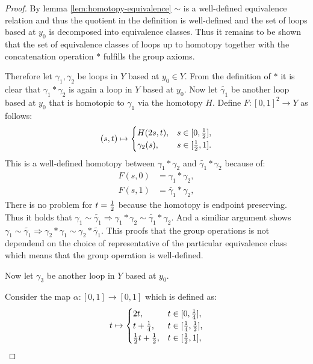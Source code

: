 \documentclass{article}
\theoremstyle{break}
\theoremstyle{break}
\begin{document}
\begin{proof}
  By lemma \ref{lem:homotopy-equivalence} $\sim$ is a well-defined equivalence relation and thus the quotient in the definition is well-defined and the set of loops based at $y_0$ is decomposed into equivalence classes.
  Thus it remains to be shown that the set of equivalence classes of loops up to homotopy together with the concatenation operation $*$ fulfills the group axioms.

  Therefore let $\gamma_1, \gamma_2$ be loops in $Y$ based at $y_0 \in Y$. From the definition of $*$ it is clear that $\gamma_1 * \gamma_2$ is again a loop in $Y$ based at $y_0$.
  Now let $\tilde{\gamma_1}$ be another loop based at $y_0$ that is homotopic to $\gamma_1$ via the homotopy $H$. Define $F: [0,1]^2 \to Y$ as follows:
  \begin{equation*}
    (s, t) \mapsto \begin{cases}
      H(2s, t), &s \in [0,{1 \over 2}], \\
      \gamma_2(s), &s \in [{1 \over 2}, 1].
    \end{cases}
  \end{equation*}
  This is a well-defined homotopy between $\gamma_1 * \gamma_2$ and $\tilde{\gamma_1} * \gamma_2$ because of:
  \begin{align*}
    F(s, 0) &= \gamma_1 * \gamma_2, \\
    F(s, 1) &= \tilde{\gamma_1} * \gamma_2,
  \end{align*}
  There is no problem for $t = {1 \over 2}$ because the homotopy is endpoint preserving. Thus it holds that $\gamma_1 \sim \tilde{\gamma_1} \Rightarrow \gamma_1 * \gamma_2 \sim \tilde{\gamma_1} * \gamma_2$.
  And a similiar argument shows $\gamma_1 \sim \tilde{\gamma_1} \Rightarrow \gamma_2 * \gamma_1 \sim  \gamma_2 * \tilde{\gamma_1}$. 
  This proofs that the group operations is not dependend on the choice of representative of the particular equivalence class which means that the group operation is well-defined.

  Now let $\gamma_3$ be another loop in $Y$ based at $y_0$. 
  
  Consider the map $\alpha: [0,1] \to [0,1]$ which is defined as:
  \begin{equation*}
    t \mapsto \begin{cases}
      2t, &t \in [0, {1 \over 4}], \\
      t + {1 \over 4}, &t \in [{1\over4}, {1\over2}], \\
      {1\over2}t + {1\over2}, &t\in[{1\over2}, 1],
    \end{cases}
  \end{equation*}
  

\end{proof}
\end{document}
